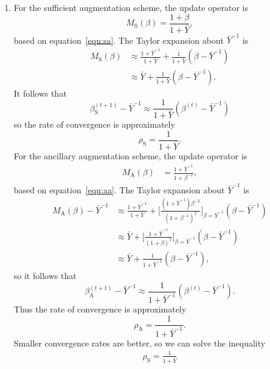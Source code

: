\begin{enumerate}
\begin{enumerate}
    \item
    For the sufficient augmentation scheme, the update operator is
        \[
        M_\mathrm{S}(\beta)
        =
        \frac{1 + \beta}{1 + \bar{Y}},
        \]
    based on equation~\ref{eqn:sa}. The Taylor expansion about $\bar{Y}^{-1}$
    is
        \begin{align*}
        M_\mathrm{S}(\beta)
        &\approx
        \frac{1 + \bar{Y}^{-1}}{1 + \bar{Y}}
        + \frac{1}{1 + \bar{Y}} (\beta - \bar{Y}^{-1})
        \\ &\approx
        \bar{Y} + \frac{1}{1 + \bar{Y}} (\beta - \bar{Y}^{-1}).
        \end{align*}
    It follows that
        \[
        \beta_\mathrm{S}^{(t+1)} - \bar{Y}^{-1}
        \approx
        \frac{1}{1 + \bar{Y}} (\beta^{(t)} - \bar{Y}^{-1})
        \]
    so the rate of convergence is approximately
        \[
        \rho_\mathrm{S}
        =
        \frac{1}{1 + \bar{Y}}.
        \]
    For the ancillary augmentation scheme, the update operator is
        \begin{align*}
        M_\mathrm{A}(\beta)
        &=
        \frac{1 + \bar{Y}^{-1}}{1 + \beta^{-1}},
        \end{align*}
    based on equation~\ref{eqn:aa}.
    The Taylor expansion about $\bar{Y}^{-1}$ is
        \begin{align*}
        M_\mathrm{A}(\beta) - \bar{Y}^{-1}
        &\approx
        \frac{1 + \bar{Y}^{-1}}{1 + \bar{Y}}
        + \biggl[
        \frac{(1 + \bar{Y}^{-1})\beta^{-2}}{(1 + \beta^{-1})^2}
        \biggr]_{\beta = \bar{Y}^{-1}}
        (\beta - \bar{Y}^{-1})
        \\ &\approx
        \bar{Y}
        + \biggl[
        \frac{1 + \bar{Y}^{-1}} {(1 + \beta)^2}
        \biggr]_{\beta = \bar{Y}^{-1}}
        (\beta - \bar{Y}^{-1})
        \\ &\approx
        \bar{Y}
        + \frac{1} {1 + \bar{Y}^{-1}}
        (\beta - \bar{Y}^{-1}),
        \end{align*}
    so it follows that
        \[
        \beta_\mathrm{A}^{(t+1)} - \bar{Y}^{-1}
        \approx
        \frac{1} {1 + \bar{Y}^{-1}}
        (\beta^{(t)} - \bar{Y}^{-1}).
        \]
    Thus the rate of convergence is approximately
        \[
        \rho_\mathrm{A}
        =
        \frac{1} {1 + \bar{Y}^{-1}}.
        \]
    Smaller convergence rates are better, so we can solve the inequality
        \begin{align*}
        \rho_\mathrm{S}
        =
        \frac{1}{1 + \bar{Y}}

\end{align*}
\end{enumerate}
\end{enumerate}
